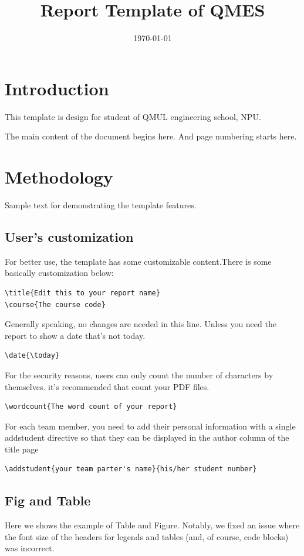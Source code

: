 \documentclass{qmes-template}
\title{Report Template of QMES}
\date{\today}
\begin{document}
\maketitle
\tableofcontents

\section{Introduction}
This template is design for student of QMUL engineering school, NPU.

The main content of the document begins here. And page numbering starts here.

\section{Methodology}
Sample text for demonstrating the template features.

\subsection{User's customization}
For better use, the template has some customizable content.There is some
basically customization below:
\begin{lstlisting}
\title{Edit this to your report name}
\course{The course code}
\end{lstlisting}

Generally speaking, no changes are needed in this line. Unless you need the
report to show a date that's not today.
\begin{lstlisting}
\date{\today}
\end{lstlisting}

For the security reasons, users can only count the number of characters by
themselves. it's recommended that count your PDF files.
\begin{lstlisting}
\wordcount{The word count of your report}
\end{lstlisting}

For each team member, you need to add their personal information with a single
addstudent directive so that they can be displayed in the author column of the
title page
\begin{lstlisting}
\addstudent{your team parter's name}{his/her student number}
\end{lstlisting}

\newpage{}
\subsection{Fig and Table}
Here we shows the example of Table and Figure. Notably, we fixed an issue where
the font size of the headers for legends and tables (and, of course, code
blocks) was incorrect.
\end{document}
